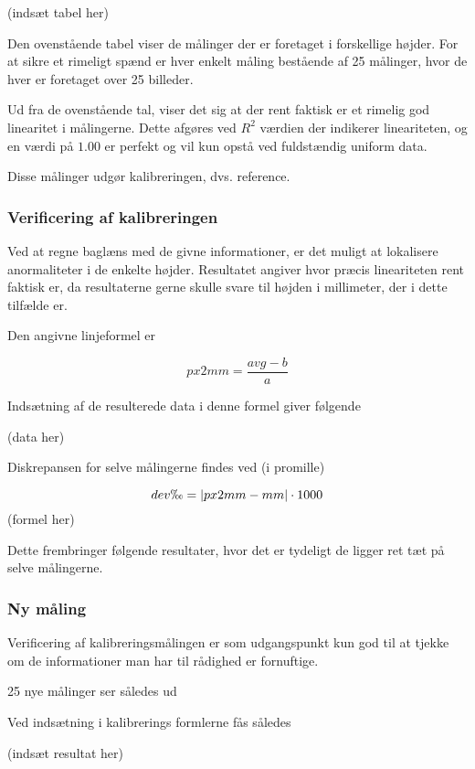 (indsæt tabel her)


Den ovenstående tabel viser de målinger der er foretaget i forskellige højder. For at sikre et rimeligt spænd er hver enkelt måling bestående af 25 målinger, hvor de hver er foretaget over 25 billeder.

Ud fra de ovenstående tal, viser det sig at der rent faktisk er et rimelig god linearitet i målingerne.
Dette afgøres ved $R^2$ værdien der indikerer lineariteten, og en værdi på $1.00$ er perfekt og vil kun opstå ved fuldstændig uniform data.

Disse målinger udgør kalibreringen, dvs. reference.

\newpage

\subsubsection{Verificering af kalibreringen}

Ved at regne baglæns med de givne informationer, er det muligt at lokalisere anormaliteter i de enkelte højder.
Resultatet angiver hvor præcis lineariteten rent faktisk er, da resultaterne gerne skulle svare til højden i millimeter, der i dette tilfælde er.

Den angivne linjeformel er

\begin{equation}
px2mm = \frac{avg - b}{a}
\end{equation}

Indsætning af de resulterede data i denne formel giver følgende

(data her)


Diskrepansen for selve målingerne findes ved (i promille)

\begin{equation}
dev\permil =  \vert px2mm - mm \vert \cdot 1000
\end{equation}
(formel her)


Dette frembringer følgende resultater, hvor det er tydeligt de ligger ret tæt på selve målingerne.



\subsubsection{Ny måling}

Verificering af kalibreringsmålingen er som udgangspunkt kun god til at tjekke om de informationer man har til rådighed er fornuftige.

25 nye målinger ser således ud

Ved indsætning i kalibrerings formlerne fås således

(indsæt resultat her)



